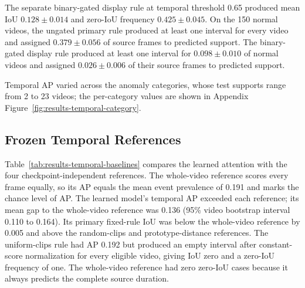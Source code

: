 The separate binary-gated display rule at temporal threshold 0.65 produced mean IoU $0.128 \pm 0.014$ and zero-IoU frequency $0.425 \pm 0.045$. On the 150 normal videos, the ungated primary rule produced at least one interval for every video and assigned $0.379 \pm 0.056$ of source frames to predicted support. The binary-gated display rule produced at least one interval for $0.098 \pm 0.010$ of normal videos and assigned $0.026 \pm 0.006$ of their source frames to predicted support.

Temporal AP varied across the anomaly categories, whose test supports range from 2 to 23 videos; the per-category values are shown in Appendix Figure~\ref{fig:results-temporal-category}.

\subsection{Frozen Temporal References}

Table~\ref{tab:results-temporal-baselines} compares the learned attention with the four checkpoint-independent references. The whole-video reference scores every frame equally, so its AP equals the mean event prevalence of 0.191 and marks the chance level of AP. The learned model's temporal AP exceeded each reference; its mean gap to the whole-video reference was 0.136 (95\% video bootstrap interval 0.110 to 0.164). Its primary fixed-rule IoU was below the whole-video reference by 0.005 and above the random-clips and prototype-distance references. The uniform-clips rule had AP 0.192 but produced an empty interval after constant-score normalization for every eligible video, giving IoU zero and a zero-IoU frequency of one. The whole-video reference had zero zero-IoU cases because it always predicts the complete source duration.

